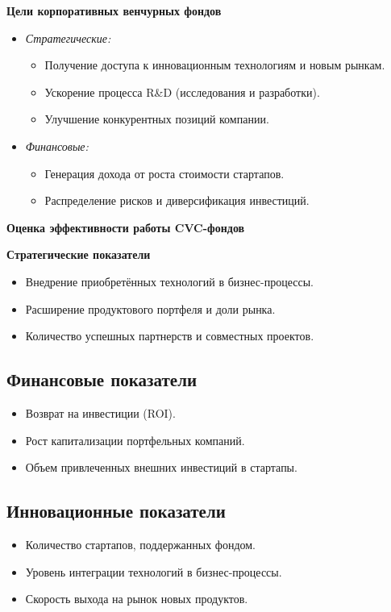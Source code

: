 \textbf{Цели корпоративных венчурных фондов}
\begin{itemize}
    \item \textit{Стратегические:}
    \begin{itemize}
        \item Получение доступа к инновационным технологиям и новым рынкам.
        \item Ускорение процесса R\&D (исследования и разработки).
        \item Улучшение конкурентных позиций компании.
    \end{itemize}
    \item \textit{Финансовые:}
    \begin{itemize}
        \item Генерация дохода от роста стоимости стартапов.
        \item Распределение рисков и диверсификация инвестиций.
    \end{itemize}
\end{itemize}

\textbf{Оценка эффективности работы CVC-фондов}

\textbf{Стратегические показатели}

\begin{itemize}
    \item Внедрение приобретённых технологий в бизнес-процессы.
    \item Расширение продуктового портфеля и доли рынка.
    \item Количество успешных партнерств и совместных проектов.
\end{itemize}

\subsection*{Финансовые показатели}
\begin{itemize}
    \item Возврат на инвестиции (ROI).
    \item Рост капитализации портфельных компаний.
    \item Объем привлеченных внешних инвестиций в стартапы.
\end{itemize}

\subsection*{Инновационные показатели}
\begin{itemize}
    \item Количество стартапов, поддержанных фондом.
    \item Уровень интеграции технологий в бизнес-процессы.
    \item Скорость выхода на рынок новых продуктов.
\end{itemize}

